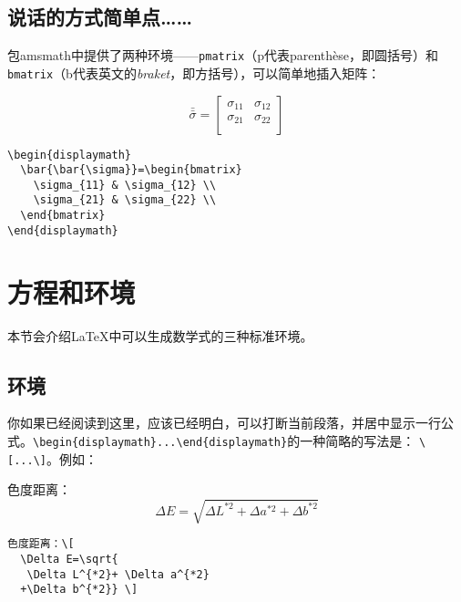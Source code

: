 \subsection{说话的方式简单点……}

包\textsf{amsmath}中提供了两种环境——\verb|pmatrix|（p代表parenthèse，即圆括号）和\verb|bmatrix|（b代表英文的\emph{braket}，即方括号），可以简单地插入矩阵：

\begin{codelist}[3.19]{
  \begin{displaymath}
    \bar{\bar{\sigma}}=\begin{bmatrix}
      \sigma_{11} & \sigma_{12} \\
      \sigma_{21} & \sigma_{22} \\
    \end{bmatrix}
  \end{displaymath}
}\begin{verbatim}
\begin{displaymath}
  \bar{\bar{\sigma}}=\begin{bmatrix}
    \sigma_{11} & \sigma_{12} \\
    \sigma_{21} & \sigma_{22} \\
  \end{bmatrix}
\end{displaymath}
\end{verbatim}
\end{codelist}

\section{方程和环境}

本节会介绍\LaTeX 中可以生成数学式的三种标准环境。

\subsection{环境}

你如果已经阅读到这里，应该已经明白，可以打断当前段落，并居中显示一行公式。\verb|\begin{displaymath}...\end{displaymath}|的一种简略的写法是：
\verb|\[...\]|。例如：

\begin{codelist}[3.20]{
  色度距离：\[
  \Delta E=\sqrt{
   \Delta L^{*2}+ \Delta a^{*2}
  +\Delta b^{*2}} \]
}\begin{verbatim}
色度距离：\[
  \Delta E=\sqrt{
   \Delta L^{*2}+ \Delta a^{*2}
  +\Delta b^{*2}} \]
\end{verbatim}
\end{codelist}

